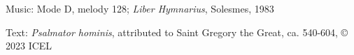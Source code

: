 

\begin{hymnsource}
Music: Mode D, melody 128; \emph{Liber Hymnarius}, Solesmes, 1983

Text: \emph{Psalmator hominis}, attributed to Saint Gregory the Great, ca. 540-604, © 2023 ICEL
\end{hymnsource}
